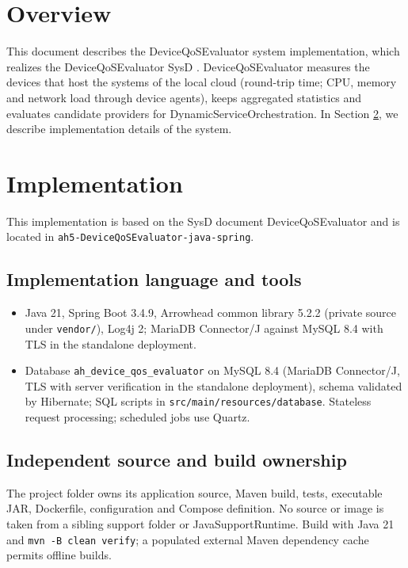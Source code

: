 \documentclass[a4paper]{arrowhead}
\begin{document}
\section{Overview}
\label{sec:overview}

This document describes the DeviceQoSEvaluator system implementation, which realizes the DeviceQoSEvaluator SysD \cite{dqe-sysd}. Device\allowbreak{}Qo\allowbreak{}SEvaluator measures the devices that host the systems of the local cloud (round-trip time; CPU, memory and network load through device agents), keeps aggregated statistics and evaluates candidate providers for Dynamic\allowbreak{}Service\allowbreak{}Orchestration.
In Section \ref{Implementation}, we describe implementation details of the system.

\newpage

\section{Implementation}
\label{Implementation}

This implementation is based on the SysD document DeviceQoSEvaluator \cite{dqe-sysd} and is located in \texttt{ah5-DeviceQoSEvaluator-java-spring}.

\subsection{Implementation language and tools}
\begin{itemize}
\item Java 21, Spring Boot 3.4.9, Arrowhead common library 5.2.2 (private source under \texttt{vendor/}), Log4j 2; MariaDB Connector/J against MySQL 8.4 with TLS in the standalone deployment.
\item Database \texttt{ah\_\allowbreak{}device\_\allowbreak{}qos\_\allowbreak{}evaluator} on MySQL 8.4 (MariaDB Connector/J, TLS with server verification in the standalone deployment), schema validated by Hibernate; SQL scripts in \texttt{src/\allowbreak{}main/\allowbreak{}resources/\allowbreak{}database}. Stateless request processing; scheduled jobs use Quartz.
\end{itemize}

\subsection{Independent source and build ownership}
The project folder owns its application source, Maven build, tests, executable JAR, Dockerfile, configuration and Compose definition. No source or image is taken from a sibling support folder or JavaSupportRuntime. Build with Java 21 and \texttt{mvn -B clean verify}; a populated external Maven dependency cache permits offline builds.
\end{document}
